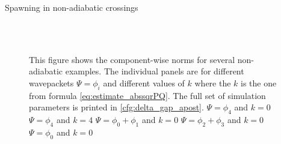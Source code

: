 \begin{chapter}{Spawning in non-adiabatic crossings}
\begin{figure}[h!]
{  } \\
   \\
  \caption[The norms for several non-adiabatic examples]{
  This figure shows the component-wise norms for several non-adiabatic examples.
  The individual panels are for different wavepackets $\Psi = \phi_i$ and different
  values of $k$ where the $k$ is the one from formula \eqref{eq:estimate_abssqrPQ}.
  The full set of simulation parameters is printed in \ref{cfg:delta_gap_apost}.
   $\Psi = \phi_4$ and $k=0$
   $\Psi = \phi_4$ and $k=4$
   $\Psi = \phi_0 + \phi_1$ and $k=0$
   $\Psi = \phi_2 + \phi_3$ and $k=0$
   $\Psi = \phi_0$ and $k=0$
  \label{fig:spawn_delta_gap_norms2}
  }
\end{figure}




\end{chapter}
